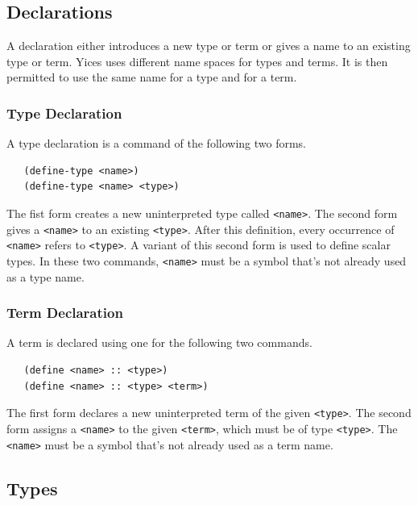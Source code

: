 \documentclass[11pt,twoside,fleqn,openright,titlepage]{cslreport}
\begin{document}
\subsection{Declarations}
\label{declarations}

A declaration either introduces a new type or term or gives a name to
an existing type or term. Yices uses different name spaces for types
and terms. It is then permitted to use the same name for a type and
for a term.


\subsubsection*{Type Declaration}

A type declaration is a command of the following two forms.
\begin{small}
\begin{verbatim}
   (define-type <name>)
   (define-type <name> <type>)
\end{verbatim}
\end{small}
The fist form creates a new uninterpreted type called
\texttt{<name>}. The second form gives a \texttt{<name>} to an
existing \texttt{<type>}. After this definition, every occurrence of
\texttt{<name>} refers to \texttt{<type>}. A variant of this second
form is used to define scalar types. In these two commands,
\texttt{<name>} must be a symbol that's not already used as a type
name.


\subsubsection*{Term Declaration}

A term is declared using one for the following two commands.
\begin{small}
\begin{verbatim}
   (define <name> :: <type>)
   (define <name> :: <type> <term>)
\end{verbatim}
\end{small}
The first form declares a new uninterpreted term of the given
\texttt{<type>}.  The second form assigns a \texttt{<name>} to the
given \texttt{<term>}, which must be of type \texttt{<type>}. The
\texttt{<name>} must be a symbol that's not already used as a term
name.



\subsection{Types}
\end{document}
